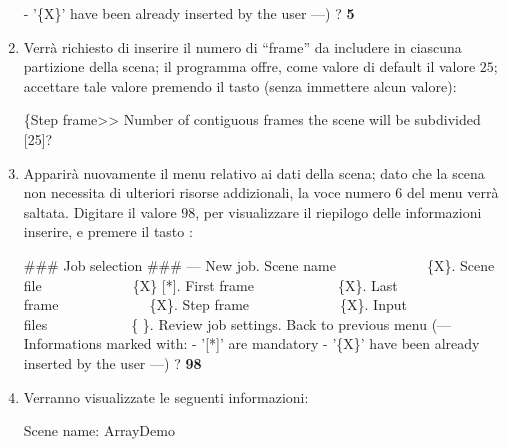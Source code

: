 \begin{enumerate}
\begin{mgCodeBox}
 - '\{X\}' have been already inserted by the user\newline
---)\newline
? \textbf{5}
\end{mgCodeBox}
\item \label{lbl:exec-array3-stepframe2-useless} Verr\`a richiesto di inserire il numero di ``frame'' da includere in ciascuna partizione della scena; il programma offre, come valore di default il valore $25$; accettare tale valore premendo il tasto  (senza immettere alcun valore):
\begin{mgCodeBox}
\small
\{Step frame>> Number of contiguous frames the scene will be subdivided [25]?
\end{mgCodeBox}
\item Apparir\`a nuovamente il menu relativo ai dati della scena; dato che la scena non necessita di ulteriori risorse addizionali, la voce numero $6$ del menu verr\`a saltata. Digitare il valore $98$, per visualizzare il riepilogo delle informazioni inserire, e premere il tasto :
\begin{mgCodeBox}
\small
\#\#\# Job selection \#\#\#\newline
--- New job. Scene name\ \ \ \ \ \ \ \ \ \ \ \ \ \{X\}. Scene file\ \ \ \ \ \ \ \ \ \ \ \ \ \{X\} [*]. First frame\ \ \ \ \ \ \ \ \ \ \ \ \{X\}. Last frame\ \ \ \ \ \ \ \ \ \ \ \ \ \{X\}. Step frame\ \ \ \ \ \ \ \ \ \ \ \ \ \{X\}. Input files\ \ \ \ \ \ \ \ \ \ \ \ \{ \}. Review job settings. Back to previous menu\newline
(---\newline
 Informations marked with:\newline
 - '[*]' are mandatory\newline
 - '\{X\}' have been already inserted by the user\newline
---)\newline
? \textbf{98}
\end{mgCodeBox}
\item Verranno visualizzate le seguenti informazioni:
\begin{mgCodeBox}
\small
Scene name: ArrayDemo\newline

\end{mgCodeBox}
\end{enumerate}
